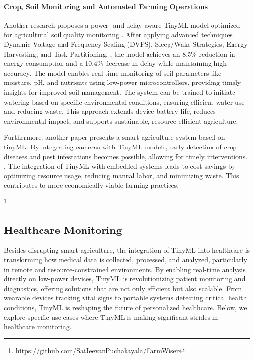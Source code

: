 \documentclass[twocolumn]{article}
\begin{document}
\paragraph{Crop, Soil Monitoring and Automated Farming Operations}

Another research proposes a power- and delay-aware TinyML model optimized for agricultural soil quality monitoring \cite{bhattacharya_deploying_2024}. After applying advanced techniques Dynamic Voltage and Frequency Scaling (DVFS), Sleep/Wake Strategies, Energy Harvesting, and Task Partitioning, , the model achieves an 8.5\% reduction in energy consumption and a 10.4\% decrease in delay while maintaining high accuracy. The model enables real-time monitoring of soil parameters like moisture, pH, and nutrients using low-power microcontrollers, providing timely insights for improved soil management. The system can be trained to initiate watering based on specific environmental conditions, ensuring efficient water use and reducing waste. This approach extends device battery life, reduces environmental impact, and supports sustainable, resource-efficient agriculture. 

Furthermore, another paper presents a smart agriculture system based on tinyML. By integrating cameras with TinyML models, early detection of crop diseases and pest infestations becomes possible, allowing for timely interventions. \cite{tsoukas_tinyml-based_2023}. The integration of TinyML with embedded systems leads to cost savings by optimizing resource usage, reducing manual labor, and minimizing waste. This contributes to more economically viable farming practices.


\footnote{\url{https://github.com/SaiJeevanPuchakayala/FarmWiser}}

\subsection{Healthcare Monitoring}

Besides disrupting smart agriculture, the integration of TinyML into healthcare is transforming how medical data is collected, processed, and analyzed, particularly in remote and resource-constrained environments. By enabling real-time analysis directly on low-power devices, TinyML is revolutionizing patient monitoring and diagnostics, offering solutions that are not only efficient but also scalable. From wearable devices tracking vital signs to portable systems detecting critical health conditions, TinyML is reshaping the future of personalized healthcare. Below, we explore specific use cases where TinyML is making significant strides in healthcare monitoring.
\end{document}

